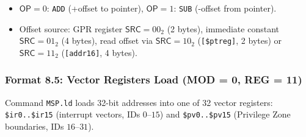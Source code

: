 \documentclass[11pt,a4paper]{article}
\newcommand{\field}[1]{\textsf{#1}}
\begin{document}
\begin{center}
\end{center}

\begin{itemize}
  \item $\field{OP} = 0$: \texttt{ADD} (+offset to pointer), $\field{OP} = 1$: \texttt{SUB} (-offset from pointer).
  \item Offset source: GPR register $\field{SRC}=00_2$ (2 bytes), immediate constant $\field{SRC}=01_2$ (4 bytes), read offset via $\field{SRC}=10_2$ (\texttt{[\$ptreg]}, 2 bytes) or $\field{SRC}=11_2$ (\texttt{[addr16]}, 4 bytes).
\end{itemize}

\subsubsection{Format 8.5: Vector Registers Load (MOD = 0, REG = 11)}
Command \texttt{MSP.ld} loads 32-bit addresses into one of 32 vector registers: \texttt{\$ir0..\$ir15} (interrupt vectors, IDs $0$--$15$) and \texttt{\$pv0..\$pv15} (Privilege Zone boundaries, IDs $16$--$31$).
\end{document}
